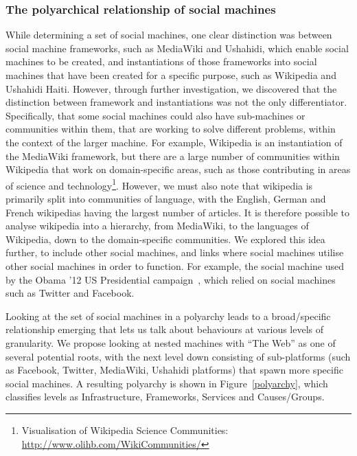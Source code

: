\documentclass{sig-alternate}
\begin{document}
\subsubsection{The polyarchical relationship of social machines}
While determining a set of social machines, one clear distinction was between social machine frameworks, such as MediaWiki and Ushahidi, which enable
social machines to be created, and instantiations of those frameworks into social machines that have been created for a specific purpose, such as Wikipedia
and Ushahidi Haiti. However, through further investigation, we discovered that the distinction between framework and instantiations was not the only
differentiator. Specifically, that some social machines could also have sub-machines or communities within them, that are working to solve different problems,
within the context of the larger machine. For example, Wikipedia is an instantiation of the MediaWiki framework, but there are a large number of
communities within Wikipedia that work on domain-specific areas, such as those contributing in areas of science and technology\footnote{Visualisation of Wikipedia Science Communities: \url{http://www.olihb.com/WikiCommunities/}}. However, we must also note that wikipedia is primarily split into communities of language, with the English, German and French wikipedias having the largest number of articles. It is therefore possible to analyse wikipedia into a hierarchy, from MediaWiki, to the languages of Wikipedia, down to the domain-specific communities. We explored this idea further, to include other social machines, and links where social machines utilise other social machines in order to function. For example, the social machine used by the Obama '12 US Presidential campaign~\cite{obamakieron}, which relied on social machines such as Twitter and Facebook.

Looking at the set of social machines in a polyarchy leads to a broad/specific relationship emerging that lets us talk about behaviours at various levels of granularity.  We propose looking at nested machines with ``The Web'' as one of several potential roots, with the next level down consisting of sub-platforms (such as Facebook, Twitter, MediaWiki, Ushahidi platforms) that spawn more specific social machines. A resulting polyarchy is shown in Figure~\ref{polyarchy}, which classifies levels as Infrastructure, Frameworks, Services and Causes/Groups.
\end{document}
